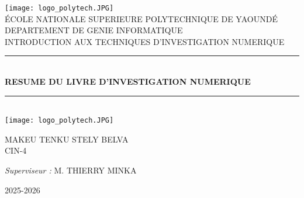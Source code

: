 \documentclass[12pt,a4paper]{article}
\newcommand{\HRule}{\rule{\linewidth}{0.5mm}}
\begin{document}
	\begin{titlepage}
	\begin{sffamily}
		\begin{center}
			
			\texttt{[image: logo\_polytech.JPG]}~\\[1.5cm]
			
			\textsc{\LARGE ÉCOLE NATIONALE SUPERIEURE POLYTECHNIQUE DE YAOUNDÉ }\\[2cm]
			
			\textsc{\LARGE DEPARTEMENT DE GENIE INFORMATIQUE }\\[2cm]
			
			\textsc{\LARGE INTRODUCTION AUX TECHNIQUES D'INVESTIGATION NUMERIQUE }\\[1.5cm]
			
			\HRule \\[0.4cm]
			{ \huge \bfseries RESUME DU LIVRE D'INVESTIGATION NUMERIQUE\\[0.4cm] }
			
			\HRule \\[2cm]
			\texttt{[image: logo\_polytech.JPG]}
			\\[2cm]
			
			\begin{minipage}{0.4\textwidth}
				\begin{flushleft} \large
					MAKEU TENKU STELY BELVA\\
					CIN-4\\
				\end{flushleft}
			\end{minipage}
			\begin{minipage}{0.4\textwidth}
				\begin{flushright} \large
					\emph{Superviseur :} M.  \textsc{THIERRY MINKA}\\
					
				\end{flushright}
			\end{minipage}
			
			\vfill
			
			{\large 2025-2026}
			
		\end{center}
	\end{sffamily}
\end{titlepage}
	
\end{document}
